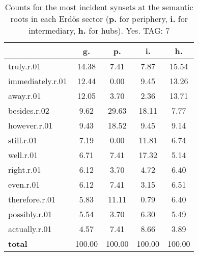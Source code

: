 \begin{table}[h!]
\begin{center}
\begin{tabular}{| l || c | c | c | c |}\hline
 & {\bf g.} & {\bf p.} & {\bf i.} & {\bf h.} \\\hline\hline
truly.r.01 & 14.38  & 7.41  & 7.87  & 15.54 \\\hline
immediately.r.01 & 12.44  & 0.00  & 9.45  & 13.26 \\\hline
away.r.01 & 12.05  & 3.70  & 2.36  & 13.71 \\\hline
besides.r.02 & 9.62  & 29.63  & 18.11  & 7.77 \\\hline
however.r.01 & 9.43  & 18.52  & 9.45  & 9.14 \\\hline
still.r.01 & 7.19  & 0.00  & 11.81  & 6.74 \\\hline
well.r.01 & 6.71  & 7.41  & 17.32  & 5.14 \\\hline
right.r.01 & 6.12  & 3.70  & 4.72  & 6.40 \\\hline
even.r.01 & 6.12  & 7.41  & 3.15  & 6.51 \\\hline
therefore.r.01 & 5.83  & 11.11  & 0.79  & 6.40 \\\hline
possibly.r.01 & 5.54  & 3.70  & 6.30  & 5.49 \\\hline
actually.r.01 & 4.57  & 7.41  & 8.66  & 3.89 \\\hline\hline
{{\bf total}} & 100.00  & 100.00  & 100.00  & 100.00 \\\hline
\end{tabular}
\caption{Counts for the most incident synsets at the semantic roots in each Erd\"os sector ({\bf p.} for periphery, {\bf i.} for intermediary, {\bf h.} for hubs). Yes. TAG: 7}
\end{center}
\end{table}